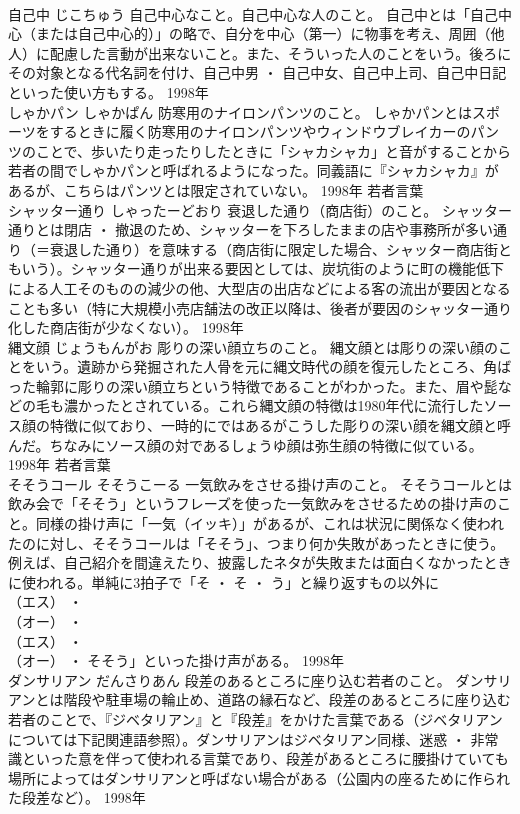 \documentclass[8pt]{extreport}
\begin{document}
\begin{CJK}{UTF8}{min}
\\	自己中	じこちゅう	自己中心なこと。自己中心な人のこと。	自己中とは「自己中心（または自己中心的）」の略で、自分を中心（第一）に物事を考え、周囲（他人）に配慮した言動が出来ないこと。また、そういった人のことをいう。後ろにその対象となる代名詞を付け、自己中男 ・ 自己中女、自己中上司、自己中日記といった使い方もする。	1998年	
\\	しゃかパン	しゃかぱん	防寒用のナイロンパンツのこと。	しゃかパンとはスポーツをするときに履く防寒用のナイロンパンツやウィンドウブレイカーのパンツのことで、歩いたり走ったりしたときに「シャカシャカ」と音がすることから若者の間でしゃかパンと呼ばれるようになった。同義語に『シャカシャカ』があるが、こちらはパンツとは限定されていない。	1998年	若者言葉	
\\	シャッター通り	しゃったーどおり	衰退した通り（商店街）のこと。	シャッター通りとは閉店 ・ 撤退のため、シャッターを下ろしたままの店や事務所が多い通り（＝衰退した通り）を意味する（商店街に限定した場合、シャッター商店街ともいう）。シャッター通りが出来る要因としては、炭坑街のように町の機能低下による人工そのものの減少の他、大型店の出店などによる客の流出が要因となることも多い（特に大規模小売店舗法の改正以降は、後者が要因のシャッター通り化した商店街が少なくない）。	1998年	
\\	縄文顔	じょうもんがお	彫りの深い顔立ちのこと。	縄文顔とは彫りの深い顔のことをいう。遺跡から発掘された人骨を元に縄文時代の顔を復元したところ、角ばった輪郭に彫りの深い顔立ちという特徴であることがわかった。また、眉や髭などの毛も濃かったとされている。これら縄文顔の特徴は1980年代に流行したソース顔の特徴に似ており、一時的にではあるがこうした彫りの深い顔を縄文顔と呼んだ。ちなみにソース顔の対であるしょうゆ顔は弥生顔の特徴に似ている。	1998年	若者言葉	
\\	そそうコール	そそうこーる	一気飲みをさせる掛け声のこと。	そそうコールとは飲み会で「そそう」というフレーズを使った一気飲みをさせるための掛け声のこと。同様の掛け声に「一気（イッキ）」があるが、これは状況に関係なく使われたのに対し、そそうコールは「そそう」、つまり何か失敗があったときに使う。例えば、自己紹介を間違えたり、披露したネタが失敗または面白くなかったときに使われる。単純に3拍子で「そ ・ そ ・ う」と繰り返すもの以外に
\\	（エス） ・ 
\\	（オー） ・ 
\\	（エス） ・ 
\\	（オー） ・ そそう」といった掛け声がある。	1998年	
\\	ダンサリアン	だんさりあん	段差のあるところに座り込む若者のこと。	ダンサリアンとは階段や駐車場の輪止め、道路の縁石など、段差のあるところに座り込む若者のことで、『ジベタリアン』と『段差』をかけた言葉である（ジベタリアンについては下記関連語参照）。ダンサリアンはジベタリアン同様、迷惑 ・ 非常識といった意を伴って使われる言葉であり、段差があるところに腰掛けていても場所によってはダンサリアンと呼ばない場合がある（公園内の座るために作られた段差など）。	1998年	

\end{CJK}
\end{document}
